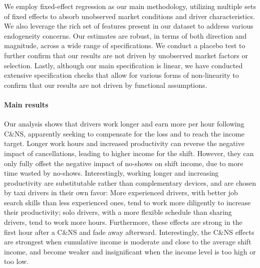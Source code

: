 \documentclass[reviewmode,AEJ]{AEA}
\begin{document}
We employ fixed-effect regression as our main methodology, utilizing multiple sets of fixed effects 
to absorb unobserved market conditions and driver characteristics. We also leverage the rich set of 
features present in our dataset to address various endogeneity concerns. Our estimates are robust, 
in terms of both direction and magnitude, across a wide range of specifications. We conduct a placebo 
test to further confirm that our results are not driven by unobserved market factors or selection. Lastly, 
although our main specification is linear, we have conducted extensive specification checks that allow for
various forms of non-linearity to confirm that our results are not driven by functional assumptions.


\paragraph{Main results} Our analysis shows that drivers work longer and earn more per hour following 
C\&NS, apparently seeking to compensate for the loss and to reach the income target. Longer work hours 
and increased productivity can reverse the negative impact of cancellations, leading to higher income 
for the shift. However, they can only fully offset the negative impact of no-shows on shift income, 
due to more time wasted by no-shows. Interestingly, working longer and increasing productivity are 
substitutable rather than complementary devices, and are chosen by taxi drivers in their own favor: 
More experienced drivers, with better job search skills than less experienced ones, tend to work more 
diligently to increase their productivity; solo drivers, with a more flexible schedule than sharing 
drivers, tend to work more hours. Furthermore, these effects are strong in the first hour after a 
C\&NS and fade away afterward. Interestingly, the C\&NS effects are strongest when cumulative income 
is moderate and close to the average shift income, and become weaker and insignificant when the income 
level is too high or too low. 
\end{document}
